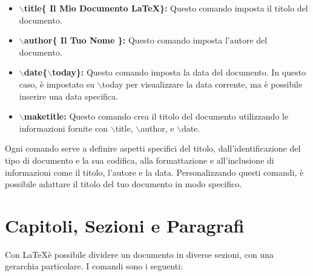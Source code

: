 \documentclass[12pt, oneside, openany, a4paper]{book}
\begin{document}
	\begin{itemize}
		\item \textbf{$\backslash$title\{ Il Mio Documento \LaTeX \}:} Questo comando imposta il titolo del documento.
		
		\item \textbf{$\backslash$author\{ Il Tuo Nome \}:} Questo comando imposta l'autore del documento.
		
		\item \textbf{$\backslash$date\{$\backslash$today\}:} Questo comando imposta la data del documento. In questo caso, è impostato su $\backslash$today per visualizzare la data corrente, ma è possibile inserire una data specifica.
		
		\item \textbf{$\backslash$maketitle:} Questo comando crea il titolo del documento utilizzando le informazioni fornite con $\backslash$title, $\backslash$author, e $\backslash$date.
		
	\end{itemize}
	
	Ogni comando serve a definire aspetti specifici del titolo, dall'identificazione del tipo di documento e la sua codifica, alla formattazione e all'inclusione di informazioni come il titolo, l'autore e la data. Personalizzando questi comandi, è possibile adattare il titolo del tuo documento in modo specifico.
	\newpage
	
	\section{Capitoli, Sezioni e Paragrafi}
	
	Con \LaTeX è possibile dividere un documento in diverse sezioni, con una gerarchia particolare. I comandi sono i seguenti:
	
\end{document}
